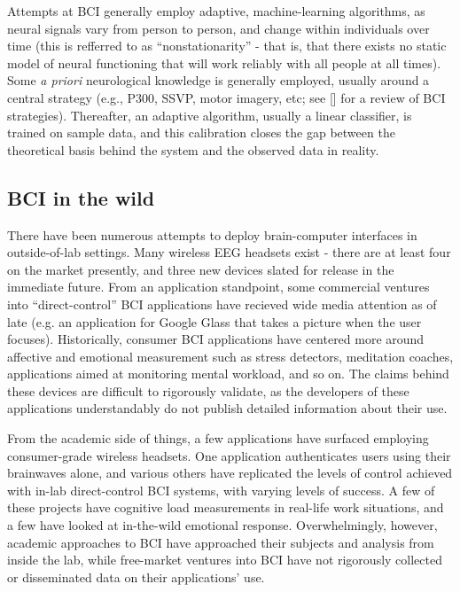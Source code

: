 \documentclass[a4paper,twoside]{article}
\begin{document}
Attempts at BCI generally employ adaptive, machine-learning algorithms, as neural signals vary from person to person, and change within individuals over time (this is refferred to as ``nonstationarity'' - that is,  that there exists no static model of neural functioning that will work reliably with all people at all times). Some \textit{a priori} neurological knowledge is generally employed, usually around a central strategy (e.g., P300, SSVP, motor imagery, etc; see [] for a review of BCI strategies). Thereafter, an adaptive algorithm, usually a linear classifier, is trained on sample data, and this calibration closes the gap between the theoretical basis behind the system and the observed data in reality.

\subsection{BCI in the wild}

There have been numerous attempts to deploy brain-computer interfaces in outside-of-lab settings. Many wireless EEG headsets exist - there are at least four on the market presently, and three new devices slated for release in the immediate future. From an application standpoint, some commercial ventures into ``direct-control'' BCI applications have recieved wide media attention as of late (e.g. an application for Google Glass that takes a picture when the user focuses). Historically, consumer BCI applications have centered more around affective and emotional measurement such as stress detectors, meditation coaches, applications aimed at monitoring mental workload, and so on. The claims behind these devices are difficult to rigorously validate, as the developers of these applications understandably do not publish detailed information about their use.

From the academic side of things, a few applications have surfaced employing consumer-grade wireless headsets. One application authenticates users using their brainwaves alone, and various others have replicated the levels of control achieved with in-lab direct-control BCI systems, with varying levels of success. A few of these projects have cognitive load measurements in real-life work situations, and a few have looked at in-the-wild emotional response. Overwhelmingly, however, academic approaches to BCI have approached their subjects and analysis from inside the lab, while free-market ventures into BCI have not rigorously collected or disseminated data on their applications' use.
\end{document}
